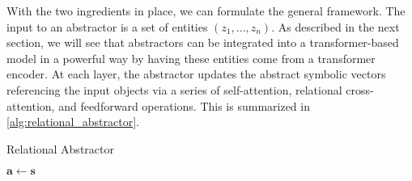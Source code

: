 With the two ingredients in place, we can formulate the general framework. The input to an abstractor is a set of entities $(z_1, ..., z_n)$. As described in the next section, we will see that abstractors can be integrated into a transformer-based model in a powerful way by having these entities come from a transformer encoder. At each layer, the abstractor updates the abstract symbolic vectors referencing the input objects via a series of self-attention, relational cross-attention, and feedforward operations. This is summarized in \ref{alg:relational_abstractor}.

\begin{algorithm}[ht!]
    \caption{Relational Abstractor}\label{alg:relational_abstractor}

    \vspace{1em}

    $\boldsymbol{a} \gets \boldsymbol{s}$

\end{algorithm}



% 
